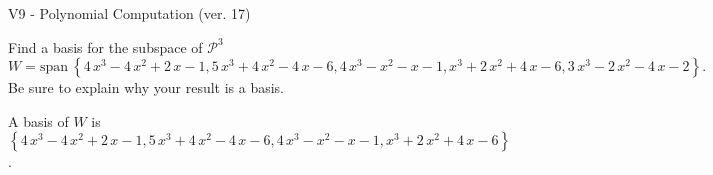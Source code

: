 \begin{exercise}
  \begin{exerciseTitle}V9 - Polynomial Computation (ver. 17)\end{exerciseTitle}
  \begin{exerciseStatement}
    Find a basis for the subspace of \(\mathcal{P}^3\) 
\[W=\mathrm{span}\ \left\{4 \, x^{3} - 4 \, x^{2} + 2 \, x - 1 , 5 \, x^{3} + 4 \, x^{2} - 4 \, x - 6 , 4 \, x^{3} - x^{2} - x - 1 , x^{3} + 2 \, x^{2} + 4 \, x - 6 , 3 \, x^{3} - 2 \, x^{2} - 4 \, x - 2\right\}.\]
 Be sure to explain why your result is a basis.


  \end{exerciseStatement}
  \begin{exerciseAnswer}
   A basis of \(W\) is  \(\left\{4 \, x^{3} - 4 \, x^{2} + 2 \, x - 1 , 5 \, x^{3} + 4 \, x^{2} - 4 \, x - 6 , 4 \, x^{3} - x^{2} - x - 1 , x^{3} + 2 \, x^{2} + 4 \, x - 6\right\}\).
  


  \end{exerciseAnswer}
\end{exercise}
